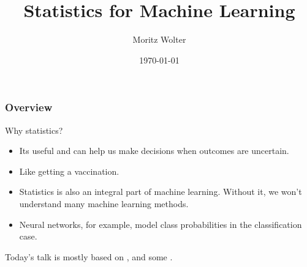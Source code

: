 \documentclass{beamer}
\title{Statistics for Machine Learning}
\date{\today}
\institute{High-Performance Computing and Analytics Lab, University of Bonn}
\author{Moritz Wolter}
\begin{document}
    \maketitle

    \begin{frame}
    \frametitle{Overview} 
    \tableofcontents

    \end{frame}


    \begin{frame}{Why statistics?}
      \begin{itemize}
        \item Its useful and can help us make decisions when outcomes are uncertain.
        \item Like getting a vaccination.
        \item Statistics is also an integral part of machine learning. Without it, we won't
         understand many machine learning methods.
        \item Neural networks, for example, model class probabilities in the classification case.
      \end{itemize}
      Today's talk is mostly based on \cite{haslwanter2016introduction},
      \cite{deisenroth2020mathematics} and some \cite{unpingco2016python}.
    \end{frame}
\end{document}
